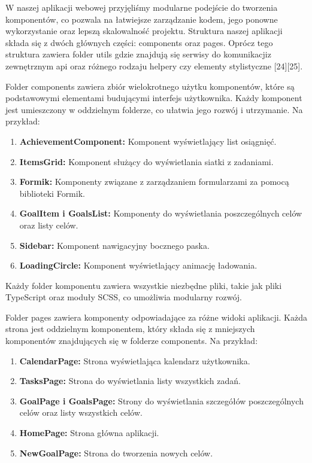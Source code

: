 
\noindent W naszej aplikacji webowej przyjęliśmy modularne podejście do tworzenia komponentów, co pozwala na łatwiejsze zarządzanie kodem, jego ponowne wykorzystanie oraz lepszą skalowalność projektu. Struktura naszej aplikacji składa się z dwóch głównych części: components oraz pages. Oprócz tego struktura zawiera folder utils gdzie znajdują się serwisy do komunikacji\linebreak z zewnętrznym api oraz różnego rodzaju helpery czy elementy stylistyczne [24][25].


\noindent Folder components zawiera zbiór wielokrotnego użytku komponentów, które są podstawowymi elementami budującymi interfejs użytkownika. Każdy komponent jest umieszczony w oddzielnym folderze, co ułatwia jego rozwój i utrzymanie. Na przykład:
\begin{enumerate}
    \item {\bf AchievementComponent:} Komponent wyświetlający list osiągnięć.
    \item {\bf ItemsGrid:} Komponent służący do wyświetlania siatki z zadaniami.
    \item {\bf Formik:} Komponenty związane z zarządzaniem formularzami za pomocą biblioteki Formik.
    \item {\bf GoalItem i GoalsList:} Komponenty do wyświetlania poszczególnych celów oraz listy celów.
    \item {\bf Sidebar:} Komponent nawigacyjny bocznego paska.
    \item {\bf LoadingCircle:} Komponent wyświetlający animację ładowania.
\end{enumerate}
\noindent Każdy folder komponentu zawiera wszystkie niezbędne pliki, takie jak pliki TypeScript oraz moduły SCSS, co umożliwia modularny rozwój.
\\


\noindent Folder pages zawiera komponenty odpowiadające za różne widoki aplikacji. Każda strona jest oddzielnym komponentem, który składa się z mniejszych komponentów znajdujących się w folderze components. Na przykład:
\begin{enumerate}
    \item {\bf CalendarPage:} Strona wyświetlająca kalendarz użytkownika.
    \item {\bf TasksPage:} Strona do wyświetlania  listy wszystkich zadań.
    \item {\bf GoalPage i GoalsPage:} Strony do wyświetlania szczegółów poszczególnych celów oraz listy wszystkich celów.
    \item {\bf HomePage:} Strona główna aplikacji.
    \item {\bf NewGoalPage:} Strona do tworzenia nowych celów.
\end{enumerate}

